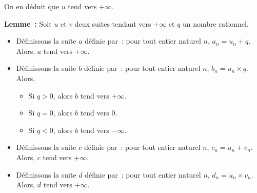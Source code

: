     On en déduit que $u$ tend vers $+\infty$.
    
    \done

\medskip

\noindent\textbf{Lemme :} Soit $u$ et $v$ deux suites tendant vers $+\infty$ et $q$ un nombre rationnel.
    \begin{itemize}[nosep]
        \item Définissons la suite $a$ définie par : pour tout entier naturel $n$, $a_n = u_n + q$.
            Alors, $a$ tend vers $+\infty$.
        \item Définissons la suite $b$ définie par : pour tout entier naturel $n$, $b_n = u_n \times q$.
            Alors, 
            \begin{itemize}[nosep]
                \item Si $q > 0$, alors $b$ tend vers $+\infty$.
                \item Si $q = 0$, alors $b$ tend vers $0$.
                \item Si $q < 0$, alors $b$ tend vers $-\infty$.
            \end{itemize}
        \item Définissons la suite $c$ définie par : pour tout entier naturel $n$, $c_n = u_n + v_n$.
            Alors, $c$ tend vers $+\infty$.
        \item Définissons la suite $d$ définie par : pour tout entier naturel $n$, $d_n = u_n \times v_n$.
            Alors, $d$ tend vers $+\infty$.
    \end{itemize}

\medskip

